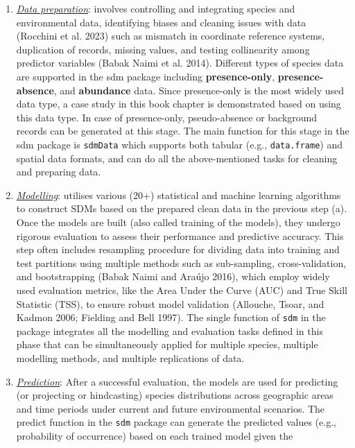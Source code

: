 \documentclass[
]{article}
\begin{document}
\begin{enumerate}
\def\labelenumi{(\alph{enumi})}
\item
  \uline{\textit{Data preparation}}: involves controlling and
  integrating species and environmental data, identifying biases and
  cleaning issues with data (Rocchini et al. 2023) such as mismatch in
  coordinate reference systems, duplication of records, missing values,
  and testing collinearity among predictor variables (Babak Naimi et al.
  2014). Different types of species data are supported in the sdm
  package including \textbf{presence-only}, \textbf{presence-absence},
  and \textbf{abundance} data. Since presence-only is the most widely
  used data type, a case study in this book chapter is demonstrated
  based on using this data type. In case of presence-only,
  pseudo-absence or background records can be generated at this stage.
  The main function for this stage in the sdm package is
  \texttt{sdmData} which supports both tabular (e.g.,
  \texttt{data.frame}) and spatial data formats, and can do all the
  above-mentioned tasks for cleaning and preparing data.
\item
  \uline{\textit{Modelling}}: utilises various (20+) statistical and
  machine learning algorithms to construct SDMs based on the prepared
  clean data in the previous step (a). Once the models are built (also
  called training of the models), they undergo rigorous evaluation to
  assess their performance and predictive accuracy. This step often
  includes resampling procedure for dividing data into training and test
  partitions using multiple methods such as sub-sampling,
  cross-validation, and bootstrapping (Babak Naimi and Araújo 2016),
  which employ widely used evaluation metrics, like the Area Under the
  Curve (AUC) and True Skill Statistic (TSS), to ensure robust model
  validation (Allouche, Tsoar, and Kadmon 2006; Fielding and Bell 1997).
  The single function of \texttt{sdm} in the package integrates all the
  modelling and evaluation tasks defined in this phase that can be
  simultaneously applied for multiple species, multiple modelling
  methods, and multiple replications of data.
\item
  \uline{\textit{Prediction}}: After a successful evaluation, the models
  are used for predicting (or projecting or hindcasting) species
  distributions across geographic areas and time periods under current
  and future environmental scenarios. The predict function in the
  \texttt{sdm} package can generate the predicted values (e.g.,
  probability of occurrence) based on each trained model given the

\end{enumerate}
\end{document}
